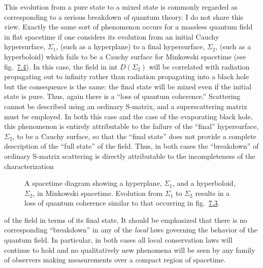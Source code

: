 \documentclass[11pt,a4paper]{article}
\begin{document}
This evolution from a pure state to a mixed state is commonly regarded as corresponding to a serious breakdown of quantum theory. I do not share this view. Exactly the same sort of phenomenon occurs for a massless quantum field in flat spacetime if one considers its evolution from an initial Cauchy hypersurface, \(\Sigma_1\), (such as a hyperplane) to a final hypersurface, \(\Sigma_2\), (such as a hyperboloid) which fails to be a Cauchy surface for Minkowski spacetime (see fig.~\hyperref[fig:7.4]{7.4}). In this case, the field in int \(D(\Sigma_2)\) will be correlated with radiation propagating out to infinity rather than radiation propagating into a black hole but the consequence is the same: the final state will be mixed even if the initial state is pure. Thus, again there is a ``loss of quantum coherence.'' Scattering cannot be described using an ordinary S-matrix, and a superscattering matrix must be employed. In both this case and the case of the evaporating black hole, this phenomenon is entirely attributable to the failure of the ``final'' hypersurface, \(\Sigma_2\), to be a Cauchy surface, so that the ``final state'' does not provide a complete description of the ``full state'' of the field. Thus, in both cases the ``breakdown'' of ordinary S-matrix scattering is directly attributable to the incompleteness of the characterization

\begin{figure}[htbp]
\centering
\renewcommand{\thefigure}{7.4}

\caption{A spacetime diagram showing a hyperplane, \(\Sigma_1\), and a hyperboloid, \(\Sigma_2\), in Minkowski spacetime. Evolution from \(\Sigma_1\) to \(\Sigma_2\) results in a loss of quantum coherence similar to that occurring in fig.~\hyperref[fig:7.3]{7.3}.}\label{fig:7.4}
\end{figure} \hypertarget{source-195}{} of the field in terms of its final state. It should be emphasized that there is no corresponding ``breakdown'' in any of the \emph{local} laws governing the behavior of the quantum field. In particular, in both cases all local conservation laws will continue to hold and no qualitatively new phenomena will be seen by any family of observers making measurements over a compact region of spacetime.
\end{document}

